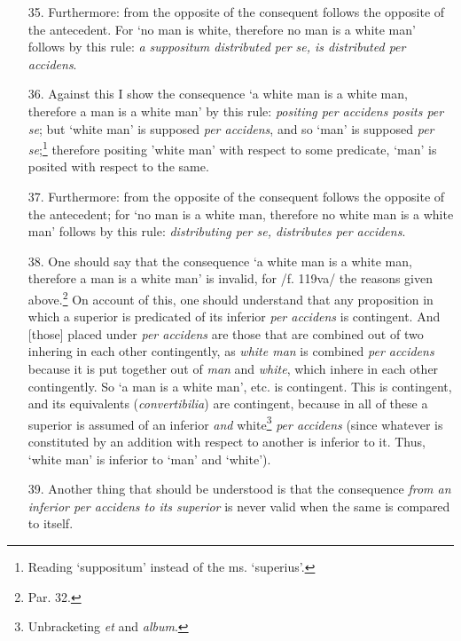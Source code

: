 \begin{enumerate}
\item[35.] Furthermore: from the opposite of the consequent follows the opposite of the antecedent. For `no man is white, therefore no man is a white man' follows by this rule: \textit{a suppositum distributed per se, is distributed per accidens}.
\item[36.] Against this I show the consequence `a white man is a white man, therefore a man is a white man' by this rule: \textit{positing per accidens posits per se}; but `white man' is supposed \textit{per accidens}, and so `man' is supposed \textit{per se};\footnote{Reading `suppositum' instead of the ms. `superius'.} therefore positing 'white man' with respect to some predicate, `man' is posited with respect to the same. 
\item[37.] Furthermore: from the opposite of the consequent follows the opposite of the antecedent; for `no man is a white man, therefore no white man is a white man' follows by this rule: \textit{distributing per se, distributes per accidens}.
\item[38.] One should say that the consequence `a white man is a white man, therefore a man is a white man' is invalid, for /f. 119va/ the reasons given above.\footnote{Par. 32.} On account of this, one should understand that any proposition in which a superior is predicated of its inferior \textit{per accidens} is contingent. And [those] placed under \textit{per accidens} are those that are combined out of two inhering in each other contingently, as \textit{white man} is combined \textit{per accidens} because it is put together out of \textit{man} and \textit{white}, which inhere in each other contingently. So `a man is a white man', etc. is contingent. This is contingent, and its equivalents (\textit{convertibilia}) are contingent, because in all of these a superior is assumed of an inferior \textit{and} white\footnote{Unbracketing \textit{et} and \textit{album}.} \textit{per accidens} (since whatever is constituted by an addition with respect to another is inferior to it. Thus, `white man' is inferior to `man' and `white').
\item[39.] Another thing that should be understood is that the consequence \textit{from an inferior \textit{per accidens} to its superior} is never valid when the same is compared to itself.

\end{enumerate}
